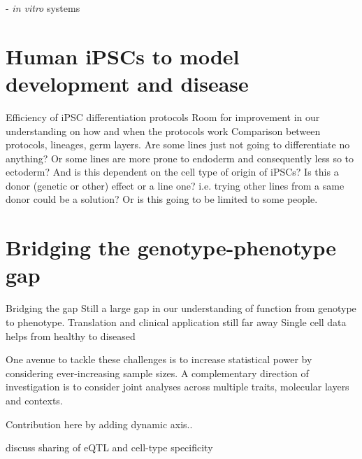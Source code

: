 - \textit{in vitro} systems

\section{Human iPSCs to model development and disease}

Efficiency of iPSC differentiation protocols
Room for improvement in our understanding on how and when the protocols work
Comparison between protocols, lineages, germ layers.
Are some lines just not going to differentiate no anything?
Or some lines are more prone to endoderm and consequently less so to ectoderm?
And is this dependent on the cell type of origin of iPSCs?
Is this a donor (genetic or other) effect or a line one?
i.e. trying other lines from a same donor could be a solution?
Or is this going to be limited to some people.

\section{Bridging the genotype-phenotype gap}

Bridging the gap
Still a large gap in our understanding of function from genotype to phenotype.
Translation and clinical application still far away
Single cell data helps
from healthy to diseased

One avenue to tackle these challenges is to increase statistical power by considering ever-increasing sample sizes. 
A complementary direction of investigation is to consider joint analyses across multiple traits, molecular layers and contexts.

Contribution here by adding dynamic axis..

discuss sharing of eQTL and cell-type specificity





